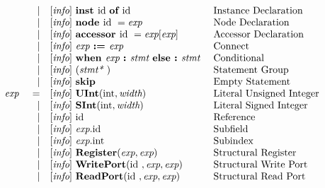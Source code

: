 \documentclass[12pt]{article}
\begin{document}
\[\begin{array}{rrll}
                &\vert &[\text{\em info}]\  \text{\bf inst\ } \text{id } \text{\bf of\ } \text{id }                                               &\text{Instance Declaration}\\
                &\vert &[\text{\em info}]\  \text{\bf node\ } \text{id }  = \text{\em exp\ }                                               &\text{Node Declaration}\\
                &\vert &[\text{\em info}]\  \text{\bf accessor\ } \text{id } = \text{\em exp}[\text{\em exp}]                                &\text{Accessor Declaration}\\
                &\vert &[\text{\em info}]\  \text{\em exp\ } \text{\bf :=\ } \text{\em exp\ }                                               &\text{Connect}\\
                &\vert &[\text{\em info}]\  \text{\bf when\ } \text{\em exp\ } \text{\bf :\ } \text{\em stmt\ } \text{\bf else :\ } \text{\em stmt\ }               &\text{Conditional}\\
                &\vert &[\text{\em info}]\  (\text{\em stmt*\ })                                                            &\text{Statement Group}\\
                &\vert &[\text{\em info}]\  \text{\bf skip\ }                                                               &\text{Empty Statement}\\
\text{\em exp\ }        &=     &[\text{\em info}]\  \text{\bf UInt}(\text{int}, \text{\em width})                                          &\text{Literal Unsigned Integer}\\
                &\vert &[\text{\em info}]\  \text{\bf SInt}(\text{int}, \text{\em width})                                          &\text{Literal Signed Integer}\\
                &\vert &[\text{\em info}]\  \text{id }                                                                     &\text{Reference}\\
                &\vert &[\text{\em info}]\  \text{\em exp}.\text{id }                                                           &\text{Subfield}\\
                &\vert &[\text{\em info}]\  \text{\em exp}.\text{int}                                                         &\text{Subindex}\\
                &\vert &[\text{\em info}]\  \text{\bf Register}(\text{\em exp}, \text{\em exp})                                    &\text{Structural Register}\\
                &\vert &[\text{\em info}]\  \text{\bf WritePort}(\text{id }, \text{\em exp}, \text{\em exp})                              &\text{Structural Write Port}\\
                &\vert &[\text{\em info}]\  \text{\bf ReadPort}(\text{id }, \text{\em exp}, \text{\em exp})                               &\text{Structural Read Port}\\
\end{array}
\]
\end{document}
